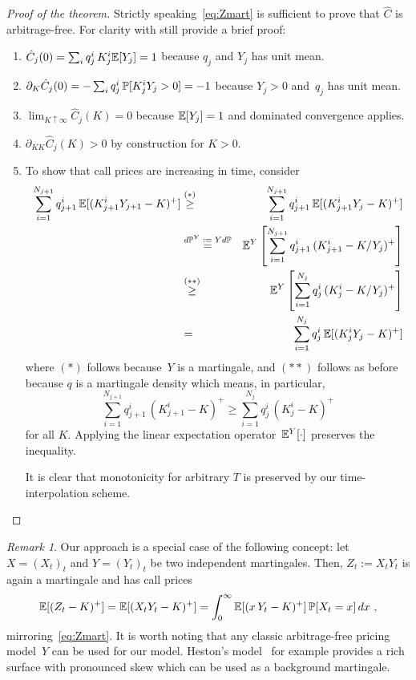 \documentclass[twoside]{article}
\theoremstyle{plain}
\theoremstyle{definition}
\theoremstyle{remark}
\newtheorem{remark}[theorem]{Remark}
\DeclareRobustCommand{\supstack}[2]{\stackrel{\mbox{{\scriptsize ${#1}$}}}{ {#2} }}     %
\begin{document}
\begin{proof}[Proof of the theorem]
Strictly speaking~\eqref{eq:Zmart} is sufficient to prove that 
$\hat C$ is arbitrage-free. For clarity with still provide a brief proof:
    \begin{enumerate}
        \item $\hat C_j(0) = \sum_i q_j^i\, K^i_j \E[ Y_j ] = 1$ because $q_j$ and $Y_j$ has unit mean.
        \item $\partial_K \hat C_j(0)= - \sum_i q_j^i\, \P[ K^i_j Y_j > 0 ] = -1$ because $Y_j>0$ and~$q_j$ has unit mean.
        \item $\lim_{K\uparrow \infty} \hat C_j(K) = 0$ because $\E[Y_j]=1$ and dominated convergence applies.
        \item $\partial_{KK} \hat C_j(K) > 0$ by construction for $K>0$.
        \item To show that call prices are increasing in time, consider
        \begin{eqnarray}
             \sum_{i=1}^{N_{j+1}} q_{j+1}^i\, \E[ ( K^i_{j+1} Y_{j+1}- K )^+ ] \nonumber
             & \supstack{(*)}\geq &
             \sum_{i=1}^{N_{j+1}} q_{j+1}^i\, \E[ ( K^i_{j+1} Y_j - K )^+ ] \nonumber\\
              & \supstack{d\P^Y := Y d\P}= &
            \E^Y\left[  \sum_{i=1}^{N_{j+1}} q_{j+1}^i\, ( K^i_{j+1}  - K/Y_j  )^+ \right] \nonumber\\
             & \supstack{(**)}\geq&
            \E^Y\left[  \sum_{i=1}^{N_j} q_j^i\,  ( K^i_j - K/Y_j  )^+ \right] \nonumber\\
             & =&
             \sum_{i=1}^{N_j} q_j^i\, \E[ ( K^i_j Y_j - K )^+ ] \nonumber
        \end{eqnarray}
        where $(*)$ follows because~$Y$ is a martingale, and $(**)$ follows as before because
        $q$ is a martingale density which means, in particular,
        $$
        \sum_{i=1}^{N_{j+1}} q_{j+1}^i\, ( K^i_{j+1} - K )^+ 
        \geq
             \sum_{i=1}^{N_j} q_j^i\, ( K^i_j - K )^+ 
        $$
        for all $K$. Applying the linear expectation operator~$\E^Y[\cdot]$ preserves the inequality.

        It is clear that monotonicity for arbitrary $T$ is preserved by our time-interpolation  scheme.
    \end{enumerate}
\end{proof}
\begin{remark}
Our approach is a special case of the following concept: let $X=(X_t)_t$ and $Y=(Y_t)_t$ be two independent martingales.
Then, $Z_t:=X_t Y_t$ is again a martingale and has call prices
$$
    \E[ (Z_t-K)^+ ]  = \E[ ( X_tY_t - K)^+ ] = \int_0^\infty \E[ ( x\,Y_t - K)^+ ]\, \P[ X_t=x ]\,dx \ ,
$$
mirroring~\eqref{eq:Zmart}. It is worth noting that any classic arbitrage-free pricing model~$Y$ can be used for our model. Heston's model~\cite{heston1993closed} for example provides a rich surface with pronounced skew which can be used
as a background martingale.
\end{remark}
\end{document}
